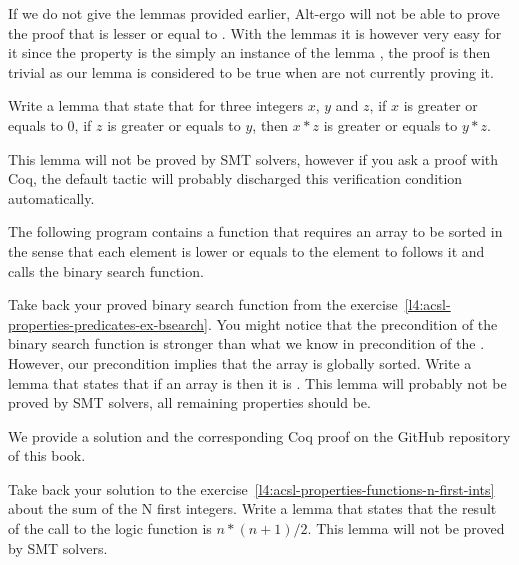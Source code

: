 


If we do not give the lemmas provided earlier, Alt-ergo will not be able
to prove the proof that  is lesser or equal to
. With the lemmas it is however very easy for it since the
property is the simply an instance of the lemma
, the proof is then trivial as our lemma is
considered to be true when are not currently proving it.








Write a lemma that state that for three integers $x$, $y$ and $z$, if $x$ is
greater or equals to $0$, if $z$ is greater or equals to $y$, then $x * z$ is
greater or equals to $y * z$.


This lemma will not be proved by SMT solvers, however if you ask a proof with
Coq, the default tactic will probably discharged this verification condition
automatically.


\label{l4:acsl-properties-lemmas-lsorted-gsorted}


The following program contains a function that requires an array to be sorted
in the sense that each element is lower or equals to the element to follows it
and calls the binary search function.




Take back your proved binary search function from the
exercise~\ref{l4:acsl-properties-predicates-ex-bsearch}. You might notice that
the precondition of the binary search function is stronger than what we know in
precondition of the . However, our precondition
implies that the array is globally sorted. Write a lemma that states that if
an array is  then it is .
This lemma will probably not be proved by SMT solvers, all remaining properties
should be.

We provide a solution and the corresponding Coq proof on the GitHub repository
of this book.


\label{l4:acsl-properties-lemmas-n-first-ints}

Take back your solution to the
exercise~\ref{l4:acsl-properties-functions-n-first-ints} about the sum of the
N first integers. Write a lemma that states that the result of the call to the
logic function is $n*(n+1)/2$. This lemma will not be proved by SMT solvers.


